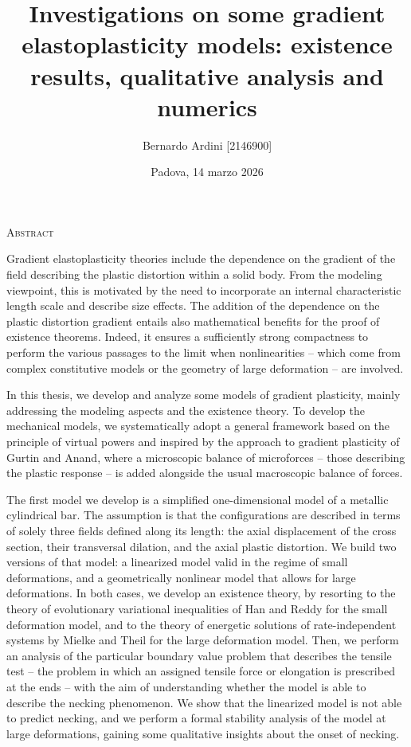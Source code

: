 \documentclass[a4paper,10pt,oneside]{amsbook}
\numberwithin{section}{chapter}
\numberwithin{equation}{chapter}
\theoremstyle{definition}
\begin{document}
\author{Bernardo Ardini [2146900]}
\date{Padova, 14 marzo 2026}
\title{\textbf{Investigations on some gradient elastoplasticity models: existence results, qualitative analysis and numerics}}

\frontmatter



\newpage

\vspace*{\fill}

\begin{center}
\large\textsc{Abstract}
\end{center}
\vspace{1em}
Gradient elastoplasticity theories include the dependence on the gradient of the field describing the plastic distortion within a solid body. From the modeling viewpoint, this is motivated by the need to incorporate an internal characteristic length scale and describe size effects. The addition of the dependence on the plastic distortion gradient entails also mathematical benefits for the proof of existence theorems. Indeed, it ensures a sufficiently strong compactness to perform the various passages to the limit when nonlinearities -- which come from complex constitutive models or the geometry of large deformation -- are involved.

In this thesis, we develop and analyze some models of gradient plasticity, mainly addressing the modeling aspects and the existence theory. To develop the mechanical models, we systematically adopt a general framework based on the principle of virtual powers and inspired by the approach to gradient plasticity of Gurtin and Anand, where a microscopic balance of microforces -- those describing the plastic response -- is added alongside the usual macroscopic balance of forces.

The first model we develop is a simplified one-dimensional model of a metallic cylindrical bar. The assumption is that the configurations are described in terms of solely three fields defined along its length: the axial displacement of the cross section, their transversal dilation, and the axial plastic distortion. We build two versions of that model: a linearized model valid in the regime of small deformations, and a geometrically nonlinear model that allows for large deformations. In both cases, we develop an existence theory, by resorting to the theory of evolutionary variational inequalities of Han and Reddy for the small deformation model, and to the theory of energetic solutions of rate-independent systems by Mielke and Theil for the large deformation model. Then, we perform an analysis of the particular boundary value problem that describes the tensile test -- the problem in which an assigned tensile force or elongation is prescribed at the ends -- with the aim of understanding whether the model is able to describe the necking phenomenon. We show that the linearized model is not able to predict necking, and we perform a formal stability analysis of the model at large deformations, gaining some qualitative insights about the onset of necking.
\end{document}

